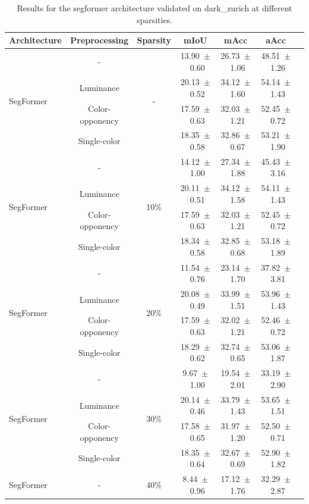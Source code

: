 \begin{table}[h]
\centering
\caption{Results for the segformer architecture validated on dark_zurich at different sparsities.}
\begin{tabular}{@{}lccc ccc@{}}
\toprule
Architecture & Preprocessing & Sparsity & mIoU & mAcc & aAcc \\
\midrule

\multirow{4}{*}{SegFormer} & - & \multirow{4}{*}{-} & 13.90~$\pm$~0.60 & 26.73~$\pm$~1.06 & 48.51~$\pm$~1.26 \\
& Luminance & & 20.13~$\pm$~0.52 & 34.12~$\pm$~1.60 & 54.14~$\pm$~1.43 \\
& Color-opponency & & 17.59~$\pm$~0.63 & 32.03~$\pm$~1.21 & 52.45~$\pm$~0.72 \\
& Single-color & & 18.35~$\pm$~0.58 & 32.86~$\pm$~0.67 & 53.21~$\pm$~1.90 \\
\midrule
\multirow{4}{*}{SegFormer} & - & \multirow{4}{*}{10\%} & 14.12~$\pm$~1.00 & 27.34~$\pm$~1.88 & 45.43~$\pm$~3.16 \\
& Luminance & & 20.11~$\pm$~0.51 & 34.12~$\pm$~1.58 & 54.11~$\pm$~1.43 \\
& Color-opponency & & 17.59~$\pm$~0.63 & 32.03~$\pm$~1.21 & 52.45~$\pm$~0.72 \\
& Single-color & & 18.34~$\pm$~0.58 & 32.85~$\pm$~0.68 & 53.18~$\pm$~1.89 \\
\midrule
\multirow{4}{*}{SegFormer} & - & \multirow{4}{*}{20\%} & 11.54~$\pm$~0.76 & 23.14~$\pm$~1.70 & 37.82~$\pm$~3.81 \\
& Luminance & & 20.08~$\pm$~0.49 & 33.99~$\pm$~1.51 & 53.96~$\pm$~1.43 \\
& Color-opponency & & 17.59~$\pm$~0.63 & 32.02~$\pm$~1.21 & 52.46~$\pm$~0.72 \\
& Single-color & & 18.29~$\pm$~0.62 & 32.74~$\pm$~0.65 & 53.06~$\pm$~1.87 \\
\midrule
\multirow{4}{*}{SegFormer} & - & \multirow{4}{*}{30\%} & 9.67~$\pm$~1.00 & 19.54~$\pm$~2.01 & 33.19~$\pm$~2.90 \\
& Luminance & & 20.14~$\pm$~0.46 & 33.79~$\pm$~1.43 & 53.65~$\pm$~1.51 \\
& Color-opponency & & 17.58~$\pm$~0.65 & 31.97~$\pm$~1.20 & 52.50~$\pm$~0.71 \\
& Single-color & & 18.35~$\pm$~0.64 & 32.67~$\pm$~0.69 & 52.90~$\pm$~1.82 \\
\midrule
\multirow{4}{*}{SegFormer} & - & \multirow{4}{*}{40\%} & 8.44~$\pm$~0.96 & 17.12~$\pm$~1.76 & 32.29~$\pm$~2.87 \\

\end{tabular}
\end{table}
